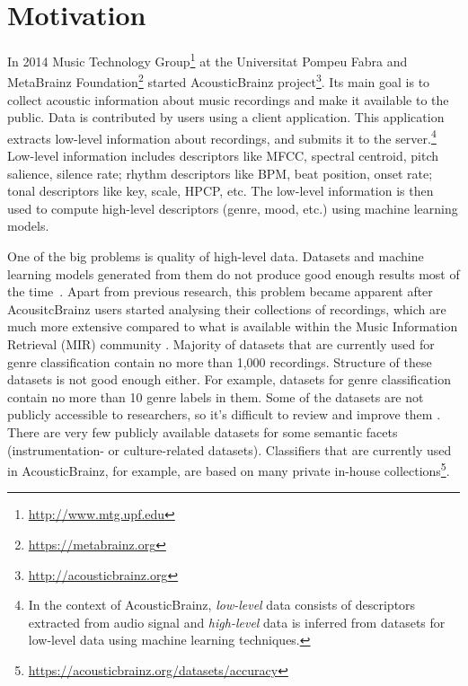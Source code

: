 \label{sec:introduction}

\section{Motivation}
\label{sec:motivation}

In 2014 Music Technology Group\footnote{\url{http://www.mtg.upf.edu}} at the Universitat Pompeu Fabra and MetaBrainz Foundation\footnote{\url{https://metabrainz.org}} started AcousticBrainz project\footnote{\url{http://acousticbrainz.org}}. Its main goal is to collect acoustic information about music recordings and make it available to the public. Data is contributed by users using a client application. This application extracts low-level information about recordings, and submits it to the server.\footnote{In the context of AcousticBrainz, \emph{low-level} data consists of descriptors extracted from audio signal and \emph{high-level} data is inferred from datasets for low-level data using machine learning techniques.} Low-level information includes descriptors like MFCC, spectral centroid, pitch salience, silence rate; rhythm descriptors like BPM, beat position, onset rate; tonal descriptors like key, scale, HPCP, etc. The low-level information is then used to compute high-level descriptors (genre, mood, etc.) using machine learning models.

One of the big problems is quality of high-level data. Datasets and machine learning models generated from them do not produce good enough results most of the time~\cite{sturm2014simple}. Apart from previous research, this problem became apparent after AcousitcBrainz users started analysing their collections of recordings, which are much more extensive compared to what is available within the Music Information Retrieval (MIR) community \cite{crosscolleval}. Majority of datasets that are currently used for genre classification contain no more than 1,000 recordings. Structure of these datasets is not good enough either. For example, datasets for genre classification contain no more than 10 genre labels in them. Some of the datasets are not publicly accessible to researchers, so it's difficult to review and improve them \cite{porter2015acousticbrainz}. There are very few publicly available datasets for some semantic facets (instrumentation- or culture-related datasets). Classifiers that are currently used in AcousticBrainz, for example, are based on many private in-house collections\footnote{\url{https://acousticbrainz.org/datasets/accuracy}}.

